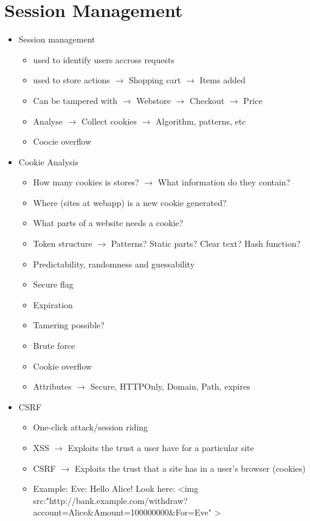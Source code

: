 \section{Session Management}
	\begin{itemize}
		\item Session management
			\begin{itemize}
				\item used to identify users accross requests
				\item used to store actions $\rightarrow$ Shopping cart $\rightarrow$ Items added
				\item Can be tampered with $\rightarrow$ Webstore $\rightarrow$ Checkout $\rightarrow$ Price
				\item Analyse $\rightarrow$ Collect cookies $\rightarrow$ Algorithm, patterns, etc
				\item Coocie overflow
			\end{itemize}
		\item Cookie Analysis
			\begin{itemize}
				\item How many cookies is stores? $\rightarrow$ What information do they contain?
				\item Where (sites at webapp) is a new cookie generated?
				\item What parts of a website needs a cookie?
				\item Token structure $\rightarrow$ Patterns? Static parts? Clear text? Hash function?
				\item Predictability, randomness and guessability
				\item Secure flag
				\item Expiration
				\item Tamering possible?
				\item Brute force
				\item Cookie overflow
				\item Attributes $\rightarrow$ Secure, HTTPOnly, Domain, Path, expires
			\end{itemize}
		\item CSRF 
			\begin{itemize}
				\item One-click attack/session riding
				\item XSS $\rightarrow$ Exploits the trust a user have for a particular site
				\item CSRF $\rightarrow$ Exploits the trust that a site has in a user's browser (cookies)
				\item Example: Eve: Hello Alice! Look here: \textless img src:"http://bank.example.com/withdraw?
				account=Alice\&Amount=100000000\&For=Eve" \textgreater
			\end{itemize}
	\end{itemize}

